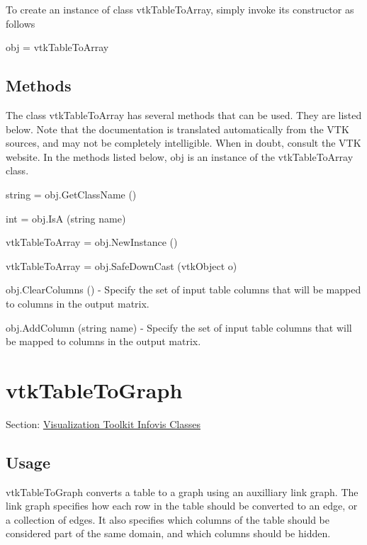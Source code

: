 To create an instance of class vtk\-Table\-To\-Array, simply invoke its constructor as follows \begin{DoxyVerb}  obj = vtkTableToArray
\end{DoxyVerb}
 \hypertarget{vtkwidgets_vtkxyplotwidget_Methods}{}\subsection{Methods}\label{vtkwidgets_vtkxyplotwidget_Methods}
The class vtk\-Table\-To\-Array has several methods that can be used. They are listed below. Note that the documentation is translated automatically from the V\-T\-K sources, and may not be completely intelligible. When in doubt, consult the V\-T\-K website. In the methods listed below, {\ttfamily obj} is an instance of the vtk\-Table\-To\-Array class. 
\begin{DoxyItemize}
\item {\ttfamily string = obj.\-Get\-Class\-Name ()}  
\item {\ttfamily int = obj.\-Is\-A (string name)}  
\item {\ttfamily vtk\-Table\-To\-Array = obj.\-New\-Instance ()}  
\item {\ttfamily vtk\-Table\-To\-Array = obj.\-Safe\-Down\-Cast (vtk\-Object o)}  
\item {\ttfamily obj.\-Clear\-Columns ()} -\/ Specify the set of input table columns that will be mapped to columns in the output matrix.  
\item {\ttfamily obj.\-Add\-Column (string name)} -\/ Specify the set of input table columns that will be mapped to columns in the output matrix.  
\end{DoxyItemize}\hypertarget{vtkinfovis_vtktabletograph}{}\section{vtk\-Table\-To\-Graph}\label{vtkinfovis_vtktabletograph}
Section\-: \hyperlink{sec_vtkinfovis}{Visualization Toolkit Infovis Classes} \hypertarget{vtkwidgets_vtkxyplotwidget_Usage}{}\subsection{Usage}\label{vtkwidgets_vtkxyplotwidget_Usage}
vtk\-Table\-To\-Graph converts a table to a graph using an auxilliary link graph. The link graph specifies how each row in the table should be converted to an edge, or a collection of edges. It also specifies which columns of the table should be considered part of the same domain, and which columns should be hidden.

